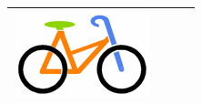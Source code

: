 \documentclass[12pt]{article}
\begin{document}
\begin{minipage}{\textwidth}
\begin{table}[H]
\begin{tabulary}{\linewidth}{|C|C|C|C|}
					\includegraphics[width=\linewidth]{option4} \\
					\hline 
				\end{tabulary}
			\end{table}
	\end{minipage} \\ \\
		
\end{document}
